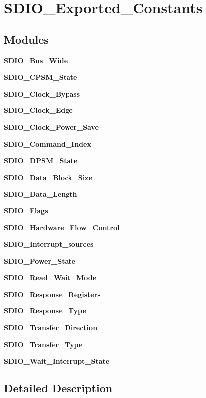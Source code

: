\section{S\+D\+I\+O\+\_\+\+Exported\+\_\+\+Constants}
\label{group__SDIO__Exported__Constants}
\subsection*{Modules}
\begin{DoxyCompactItemize}
\item 
\textbf{ S\+D\+I\+O\+\_\+\+Bus\+\_\+\+Wide}
\item 
\textbf{ S\+D\+I\+O\+\_\+\+C\+P\+S\+M\+\_\+\+State}
\item 
\textbf{ S\+D\+I\+O\+\_\+\+Clock\+\_\+\+Bypass}
\item 
\textbf{ S\+D\+I\+O\+\_\+\+Clock\+\_\+\+Edge}
\item 
\textbf{ S\+D\+I\+O\+\_\+\+Clock\+\_\+\+Power\+\_\+\+Save}
\item 
\textbf{ S\+D\+I\+O\+\_\+\+Command\+\_\+\+Index}
\item 
\textbf{ S\+D\+I\+O\+\_\+\+D\+P\+S\+M\+\_\+\+State}
\item 
\textbf{ S\+D\+I\+O\+\_\+\+Data\+\_\+\+Block\+\_\+\+Size}
\item 
\textbf{ S\+D\+I\+O\+\_\+\+Data\+\_\+\+Length}
\item 
\textbf{ S\+D\+I\+O\+\_\+\+Flags}
\item 
\textbf{ S\+D\+I\+O\+\_\+\+Hardware\+\_\+\+Flow\+\_\+\+Control}
\item 
\textbf{ S\+D\+I\+O\+\_\+\+Interrupt\+\_\+sources}
\item 
\textbf{ S\+D\+I\+O\+\_\+\+Power\+\_\+\+State}
\item 
\textbf{ S\+D\+I\+O\+\_\+\+Read\+\_\+\+Wait\+\_\+\+Mode}
\item 
\textbf{ S\+D\+I\+O\+\_\+\+Response\+\_\+\+Registers}
\item 
\textbf{ S\+D\+I\+O\+\_\+\+Response\+\_\+\+Type}
\item 
\textbf{ S\+D\+I\+O\+\_\+\+Transfer\+\_\+\+Direction}
\item 
\textbf{ S\+D\+I\+O\+\_\+\+Transfer\+\_\+\+Type}
\item 
\textbf{ S\+D\+I\+O\+\_\+\+Wait\+\_\+\+Interrupt\+\_\+\+State}
\end{DoxyCompactItemize}


\subsection{Detailed Description}
